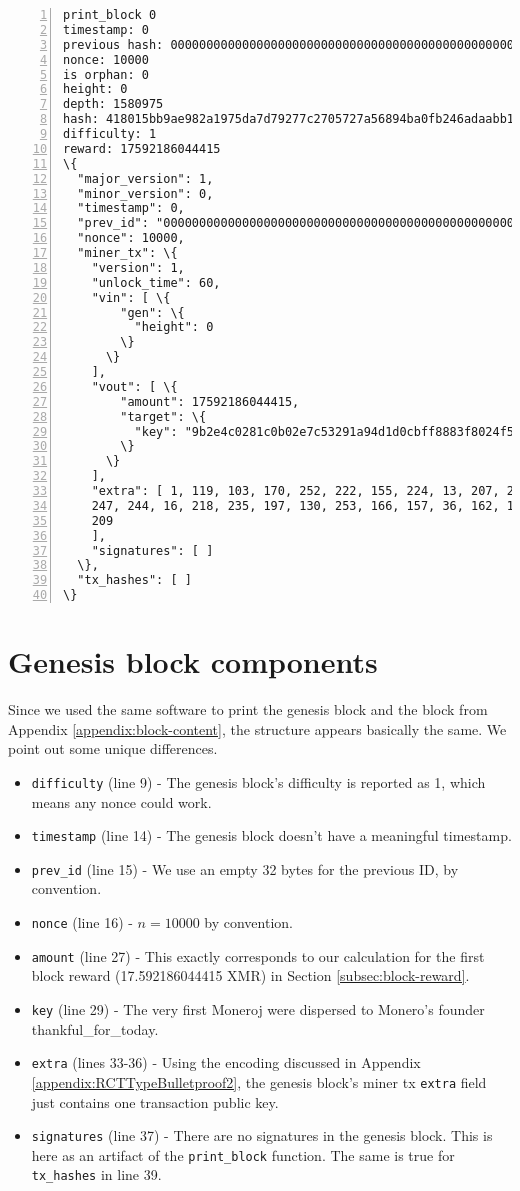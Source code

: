\begin{appendices}
\begin{Verbatim}[commandchars=\\\{\}, numbers=left]
print_block 0
timestamp: 0
previous hash: 0000000000000000000000000000000000000000000000000000000000000000
nonce: 10000
is orphan: 0
height: 0
depth: 1580975
hash: 418015bb9ae982a1975da7d79277c2705727a56894ba0fb246adaabb1f4632e3
difficulty: 1
reward: 17592186044415
\{
  "major_version": 1,
  "minor_version": 0,
  "timestamp": 0,
  "prev_id": "0000000000000000000000000000000000000000000000000000000000000000",
  "nonce": 10000,
  "miner_tx": \{
    "version": 1,
    "unlock_time": 60,
    "vin": [ \{
        "gen": \{
          "height": 0
        \}
      \}
    ],
    "vout": [ \{
        "amount": 17592186044415,
        "target": \{
          "key": "9b2e4c0281c0b02e7c53291a94d1d0cbff8883f8024f5142ee494ffbbd088071"
        \}
      \}
    ],
    "extra": [ 1, 119, 103, 170, 252, 222, 155, 224, 13, 207, 208, 152, 113, 94, 188, 
    247, 244, 16, 218, 235, 197, 130, 253, 166, 157, 36, 162, 142, 157, 11, 200, 144, 
    209
    ],
    "signatures": [ ]
  \},
  "tx_hashes": [ ]
\}
\end{Verbatim}



\section*{Genesis block components}

Since we used the same software to print the genesis block and the block from Appendix \ref{appendix:block-content}, the structure appears basically the same. We point out some unique differences.

\begin{itemize}
	\item {\tt difficulty} (line 9) - The genesis block's difficulty is reported as 1, which means any nonce could work.
	\item {\tt timestamp} (line 14) - The genesis block doesn't have a meaningful timestamp.
	\item {\tt prev\_id} (line 15) - We use an empty 32 bytes for the previous ID, by convention.
	\item {\tt nonce} (line 16) - $n = 10000$ by convention.
	\item {\tt amount} (line 27) - This exactly corresponds to our calculation for the first block reward (17.592186044415 XMR) in Section \ref{subsec:block-reward}.
	\item {\tt key} (line 29) - The very first Moneroj were dispersed to Monero's founder thankful\_for\_today.
	\item {\tt extra} (lines 33-36) - Using the encoding discussed in Appendix \ref{appendix:RCTTypeBulletproof2}, the genesis block's miner tx {\tt extra} field just contains one transaction public key.
	\item {\tt signatures} (line 37) - There are no signatures in the genesis block. This is here as an artifact of the {\tt print\_block} function. The same is true for {\tt tx\_hashes} in line 39.
\end{itemize}


\end{appendices}